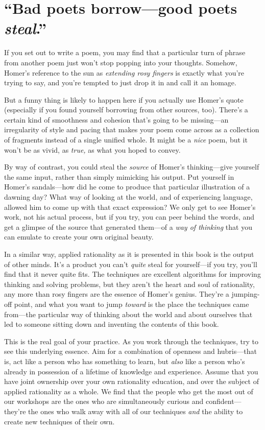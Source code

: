 \section*{``Bad poets borrow---good poets \emph{steal}.''}

If you set out to write a poem, you may find that a particular turn of phrase from another poem just won't stop popping into your thoughts.  Somehow, Homer's reference to the sun as \emph{extending rosy fingers} is exactly what you're trying to say, and you're tempted to just drop it in and call it an homage.

\setlength{\parindent}{1.5em}
But a funny thing is likely to happen here if you actually use Homer's quote (especially if you found yourself borrowing from other sources, too).  There's a certain kind of smoothness and cohesion that's going to be missing---an irregularity of style and pacing that makes your poem come across as a collection of fragments instead of a single unified whole.  It might be a \emph{nice} poem, but it won't be as vivid, as \emph{true,} as what you hoped to convey.

By way of contrast, you could steal the \emph{source} of Homer's thinking---give yourself the same input, rather than simply mimicking his output.  Put yourself in Homer's sandals---how did he come to produce that particular illustration of a dawning day?  What way of looking at the world, and of experiencing language, allowed him to come up with that exact expression?  We only get to see Homer's work, not his actual process, but if you try, you can peer behind the words, and get a glimpse of the source that generated them---of a \emph{way of thinking} that you can emulate to create your own original beauty.

In a similar way, applied rationality as it is presented in this book is the output of other minds.  It's a product you can't \emph{quite} steal for yourself---if you try, you'll find that it never quite fits.  The techniques are excellent algorithms for improving thinking and solving problems, but they aren't the heart and soul of rationality, any more than rosy fingers are the essence of Homer's genius.  They're a jumping-off point, and what you want to jump \emph{toward} is the place the techniques came from---the particular way of thinking about the world and about ourselves that led to someone sitting down and inventing the contents of this book.

This is the real goal of your practice.  As you work through the techniques, try to see this underlying essence.  Aim for a combination of openness and hubris---that is, act like a person who has something to learn, but \emph{also} like a person who's already in possession of a lifetime of knowledge and experience.  Assume that you have joint ownership over your own rationality education, and over the subject of applied rationality as a whole.  We find that the people who get the most out of our workshops are the ones who are simultaneously curious and confident---they're the ones who walk away with all of our techniques \emph{and} the ability to create new techniques of their own.


